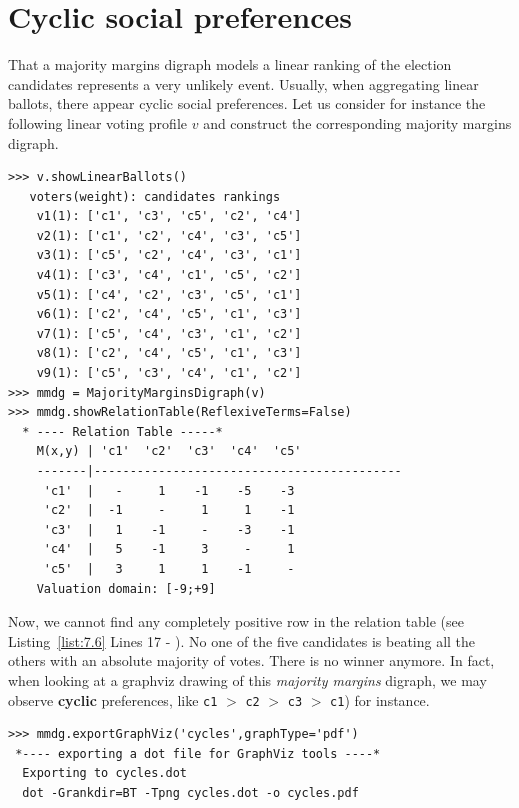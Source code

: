 \section{Cyclic social preferences}
\label{sec:7.4}

That a majority margins digraph models a linear ranking of the election candidates represents a very unlikely event. Usually, when aggregating linear ballots, there appear cyclic social preferences. Let us consider for instance the following linear voting profile $v$ and construct the corresponding majority margins digraph.
\begin{lstlisting}[caption={Example of cyclic social preferences},label=list:7.6]
>>> v.showLinearBallots()
   voters(weight): candidates rankings
    v1(1): ['c1', 'c3', 'c5', 'c2', 'c4']
    v2(1): ['c1', 'c2', 'c4', 'c3', 'c5']
    v3(1): ['c5', 'c2', 'c4', 'c3', 'c1']
    v4(1): ['c3', 'c4', 'c1', 'c5', 'c2']
    v5(1): ['c4', 'c2', 'c3', 'c5', 'c1']
    v6(1): ['c2', 'c4', 'c5', 'c1', 'c3']
    v7(1): ['c5', 'c4', 'c3', 'c1', 'c2']
    v8(1): ['c2', 'c4', 'c5', 'c1', 'c3']
    v9(1): ['c5', 'c3', 'c4', 'c1', 'c2']
>>> mmdg = MajorityMarginsDigraph(v)
>>> mmdg.showRelationTable(ReflexiveTerms=False)
  * ---- Relation Table -----*
    M(x,y) | 'c1'  'c2'  'c3'  'c4'  'c5'	  
    -------|-------------------------------------------
     'c1'  |   -     1    -1    -5    -3	 
     'c2'  |  -1     - 	   1     1    -1	 
     'c3'  |   1    -1 	   -    -3    -1	 
     'c4'  |   5    -1     3     -     1	 
     'c5'  |   3     1 	   1    -1     - 	 
    Valuation domain: [-9;+9]
\end{lstlisting}    
Now, we cannot find any completely positive row in the relation table (see Listing~\vref{list:7.6} Lines 17 - ). No one of the five candidates is beating all the others with an absolute majority of votes. There is no \Condorcet winner anymore. In fact, when looking at a graphviz drawing of this \emph{majority margins} digraph, we may observe \textbf{cyclic} preferences, like \texttt{c1} $>$ \texttt{c2} $>$ \texttt{c3} $>$ \texttt{c1}) for instance.
\begin{lstlisting}
>>> mmdg.exportGraphViz('cycles',graphType='pdf')
 *---- exporting a dot file for GraphViz tools ----*
  Exporting to cycles.dot
  dot -Grankdir=BT -Tpng cycles.dot -o cycles.pdf
\end{lstlisting}
